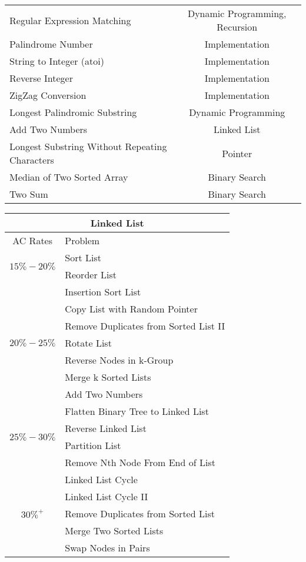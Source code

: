 \documentclass[paper=a4, fontsize=11pt]{scrartcl} %
\begin{document}
\begin{center}
\begin{longtable}{|l|c|}
    Regular Expression Matching &   Dynamic Programming, Recursion  \\
    Palindrome Number   &   Implementation \\
    String to Integer (atoi)    &   Implementation  \\
    Reverse Integer &   Implementation \\
    ZigZag Conversion   &  Implementation  \\
    Longest Palindromic Substring   &   Dynamic Programming \\
    Add Two Numbers &   Linked List \\
    Longest Substring Without Repeating Characters  &   Pointer  \\
    Median of Two Sorted Array  &   Binary Search   \\
    Two Sum &      Binary Search    \\
    \hline

  \end{longtable}

  \pagebreak

  \begin{tabular}{|c|l|}
      \hline
      \multicolumn{2}{|c|}{Linked List} \\
      \hline
      AC Rates      &   Problem     \\
      \hline
      \multirow{2}{*}{$15\%-20\%$}  &   Sort List    \\
          & Reorder List    \\
      \hline
      \multirow{7}{*}{$20\%-25\%$}  &   Insertion Sort List    \\
          & Copy List with Random Pointer    \\
          & Remove Duplicates from Sorted List II \\
          & Rotate List \\
          & Reverse Nodes in k-Group    \\
          & Merge k Sorted Lists \\
          & Add Two Numbers \\
      \hline
      \multirow{4}{*}{$25\%-30\%$}  &   Flatten Binary Tree to Linked List    \\
          & Reverse Linked List \\
          & Partition List  \\
          & Remove Nth Node From End of List \\
      \hline
      \multirow{5}{*}{$30\%^+$}  &   Linked List Cycle    \\
          & Linked List Cycle II    \\
          & Remove Duplicates from Sorted List \\
          & Merge Two Sorted Lists \\
          & Swap Nodes in Pairs \\
      \hline
  \end{tabular}


\end{center}
\end{document}
